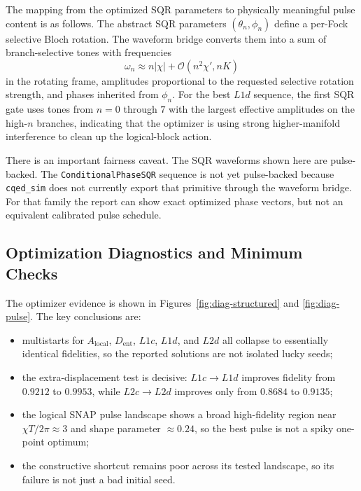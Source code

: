 \documentclass[11pt, a4paper]{article}
\begin{document}
The mapping from the optimized SQR parameters to physically meaningful pulse content is as follows. The abstract SQR parameters $(\theta_n,\phi_n)$ define a per-Fock selective Bloch rotation. The waveform bridge converts them into a sum of branch-selective tones with frequencies
\begin{equation}
\omega_n \approx n |\chi| + \mathcal{O}(n^2 \chi', n K)
\end{equation}
in the rotating frame, amplitudes proportional to the requested selective rotation strength, and phases inherited from $\phi_n$. For the best $L1d$ sequence, the first SQR gate uses tones from $n=0$ through $7$ with the largest effective amplitudes on the high-$n$ branches, indicating that the optimizer is using strong higher-manifold interference to clean up the logical-block action.

There is an important fairness caveat. The SQR waveforms shown here are pulse-backed. The \texttt{ConditionalPhaseSQR} sequence is not yet pulse-backed because \texttt{cqed\_sim} does not currently export that primitive through the waveform bridge. For that family the report can show exact optimized phase vectors, but not an equivalent calibrated pulse schedule.

\subsection{Optimization Diagnostics and Minimum Checks}

The optimizer evidence is shown in Figures~\ref{fig:diag-structured} and \ref{fig:diag-pulse}. The key conclusions are:
\begin{itemize}
\item multistarts for $A_{\mathrm{local}}$, $D_{\mathrm{ent}}$, $L1c$, $L1d$, and $L2d$ all collapse to essentially identical fidelities, so the reported solutions are not isolated lucky seeds;
\item the extra-displacement test is decisive: $L1c \rightarrow L1d$ improves fidelity from $0.9212$ to $0.9953$, while $L2c \rightarrow L2d$ improves only from $0.8684$ to $0.9135$;
\item the logical SNAP pulse landscape shows a broad high-fidelity region near $\chi T/2\pi \approx 3$ and shape parameter $\approx 0.24$, so the best pulse is not a spiky one-point optimum;
\item the constructive shortcut remains poor across its tested landscape, so its failure is not just a bad initial seed.
\end{itemize}
\end{document}
